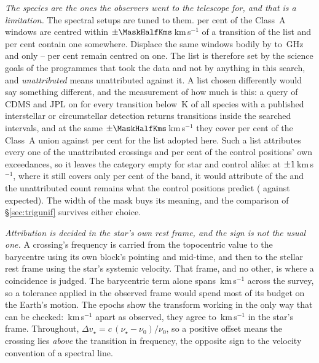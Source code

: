 \emph{The species are the ones the observers went to the telescope for, and
that is a limitation.} The spectral setups are tuned to them. \TnCenPct{} per
cent of the \NWinA{} Class~A windows are centred within
$\pm\MaskHalfKms$\,km\,s$^{-1}$ of a transition of the list and \TnWinPct{}
per cent contain one somewhere. Displace the same windows bodily by
\TnShiftLoGHz{} to \TnShiftHiGHz\,GHz and only
\TnCtrlCenLo--\TnCtrlCenHi{} per cent remain centred on one. The list is therefore set by the science goals of the programmes that took
the data and not by anything in this search, and \emph{unattributed} means
unattributed against it. A list chosen differently would say something
different, and the measurement of how much is this: a query of CDMS and JPL
\citep{Pickett1998,CDMS2005} on \XlQueryDate{} for every transition below
\XlEuMax\,K of all \XlNSpecies{} species with a published interstellar or
circumstellar detection returns \XlNTrans{} transitions inside the searched
intervals, and at the same $\pm\MaskHalfKms$\,km\,s$^{-1}$ they cover
\XlBandPct{} per cent of the Class~A union against \MkMaskAPct{} per
cent for the list adopted here. Such a list attributes every one of the
\MkUnattr{} unattributed crossings and \XlShareWidePct{} per cent of the
control positions' own exceedances, so it leaves the category empty for star
and control alike: at $\pm1$\,km\,s$^{-1}$, where it still covers
only \XlTightBandPct{} per cent of the band, it would attribute
\XlTightNIn{} of the \MkUnattr{} and the unattributed count remains what the
control positions predict (\XlTightObs{} against \XlTightExp{} expected).
The width of the mask buys its meaning, and the comparison of
\S\ref{sec:trigunif} survives either choice.

\emph{Attribution is decided in the star's own rest frame, and the sign is
not the usual one.} A crossing's frequency is carried from the topocentric
value to the barycentre using its own block's pointing and mid-time, and then
to the stellar rest frame using the star's systemic velocity. That frame, and
no other, is where a coincidence is judged.
The barycentric term alone spans \FrBarySwing\,km\,s$^{-1}$ across the
survey, so a tolerance applied in the observed frame would spend most of its
budget on the Earth's motion. The \FrEpochNEpoch{} \FrEpochStar{} epochs show
the transform working in the only way that can be checked:
\FrEpochTopoKms\,km\,s$^{-1}$ apart as observed, they agree to
\FrEpochStelKms\,km\,s$^{-1}$ in the star's frame.
Throughout, $\Delta v_\star = c\,(\nu_\star-\nu_0)/\nu_0$, so a positive
offset means the crossing lies \emph{above} the transition
in frequency, the opposite sign to the velocity convention of a spectral line.

